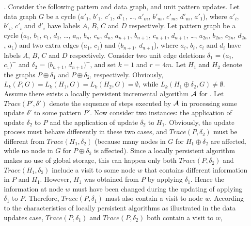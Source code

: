 \vspace{-1.5ex}
.
Consider the following pattern and data graph, and unit pattern updates.
Let data graph $G$ be a cycle ($a'_1$, $b'_1$, $c'_1$, $d'_1$, \ldots, $a'_m$, $b'_m$, $c'_m$, $d'_m$, $a'_1$),
where $a'_i$, $b'_i$, $c'_i$ and $d'_i$ have labels $A$, $B$, $C$ and $D$ respectively.
Let pattern graph be a cycle ($a_1$, $b_1$, $c_1$, $d_1$, \ldots, $a_n$, $b_n$, $c_n$, $d_n$, $a_{n+1}$, $b_{n+1}$, $c_{n+1}$, $d_{n+1}$, \ldots, $a_{2n}$, $b_{2n}$, $c_{2n}$, $d_{2n}$, $a_1$) and two extra edges ($a_1$, $c_1$) and ($b_{n+1}$, $d_{n+1}$),
where $a_i$, $b_i$, $c_i$ and $d_i$ have labels $A$, $B$, $C$ and $D$ respectively.
Consider two unit edge deletions $\delta_1$ = $(a_1$, $c_1)^-$ and $\delta_2$ = $(b_{n+1}$, $d_{n+1})^-$,
and set $k = 1$ and $r$ = $4m$.
Let $H_1$ and $H_2$ denote the graphs $P\oplus \delta_1$ and $P\oplus \delta_2$, respectively.
Obviously, $L_{k}(P, G) = L_{k}(H_1, G) = L_{k}(H_2, G) = \emptyset$,
while $L_{k}(H_1\oplus \delta_2, G) \neq \emptyset$.
Assume there exists a locally persistent incremental algorithm ${\cal A}$ for \dynteamF.
Let $Trace(P', \delta')$ denote the sequence of steps executed by ${\cal A}$ in processing some update $\delta'$ to some pattern $P'$.
Now consider two instances: the application of update $\delta_2$ to $P$ and the application of update $\delta_2$ to $H_1$.
Obviously, the update process must behave differently in these two cases, and $Trace(P, \delta_2)$ must be different from $Trace(H_1, \delta_2)$
(because many nodes in $G$ for $H_1\oplus \delta_2$ are affected, while no node in $G$ for $P\oplus \delta_2$ is affected).
Since a locally persistent algorithm makes no use of global storage,
this can happen only both $Trace(P, \delta_2)$ and $Trace(H_1, \delta_2)$ include a visit to some node $w$ that contains different information in $P$ and $H_1$.
However, $H_1$ was obtained from $P$ by applying $\delta_1$.
Hence the information at node $w$ must have been changed during the updating of applying $\delta_1$ to $P$.
Therefore, $Trace(P, \delta_1)$ must also contain a visit to node $w$.
According to the characteristics of locally persistent algorithms as illustrated in the data updates case,
$Trace(P, \delta_1)$ and $Trace(P, \delta_2)$ both contain a visit to $w$,
